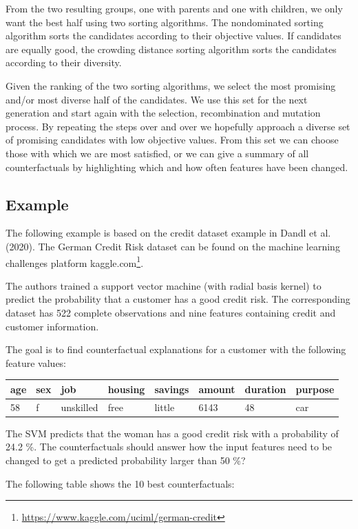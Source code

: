 \documentclass[12pt,]{krantz}
\renewcommand{\href}[2]{#2\footnote{\url{#1}}}
\begin{document}
From the two resulting groups, one with parents and one with children,
we only want the best half using two sorting algorithms. The
nondominated sorting algorithm sorts the candidates according to their
objective values. If candidates are equally good, the crowding distance
sorting algorithm sorts the candidates according to their diversity.

Given the ranking of the two sorting algorithms, we select the most
promising and/or most diverse half of the candidates. We use this set
for the next generation and start again with the selection,
recombination and mutation process. By repeating the steps over and over
we hopefully approach a diverse set of promising candidates with low
objective values. From this set we can choose those with which we are
most satisfied, or we can give a summary of all counterfactuals by
highlighting which and how often features have been changed.

\subsection{Example}\label{example-8}

The following example is based on the credit dataset example in Dandl et
al. (2020). The German Credit Risk dataset can be found on the machine
learning challenges platform
\href{https://www.kaggle.com/uciml/german-credit}{kaggle.com}.

The authors trained a support vector machine (with radial basis kernel)
to predict the probability that a customer has a good credit risk. The
corresponding dataset has 522 complete observations and nine features
containing credit and customer information.

The goal is to find counterfactual explanations for a customer with the
following feature values:

\begin{longtable}[]{@{}llllllll@{}}
\toprule
age & sex & job & housing & savings & amount & duration &
purpose\tabularnewline
\midrule
\endhead
58 & f & unskilled & free & little & 6143 & 48 & car\tabularnewline
\bottomrule
\end{longtable}

The SVM predicts that the woman has a good credit risk with a
probability of 24.2 \%. The counterfactuals should answer how the input
features need to be changed to get a predicted probability larger than
50 \%?

The following table shows the 10 best counterfactuals:
\end{document}

